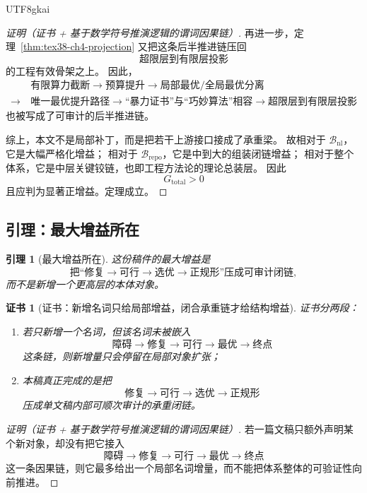 \documentclass[12pt]{article}
\newtheorem{lemma}{引理}[section]
\newtheorem{Certificate}{证书}[section]
\begin{document}
\begin{CJK*}{UTF8}{gkai}
\begin{proof}[证明（证书 + 基于数学符号推演逻辑的谓词因果链）]
再进一步，定理~\ref{thm:tex38-ch4-projection} 又把这条后半推进链压回
\[
  \text{超限层到有限层投影}
\]
的工程有效骨架之上。
因此，
\[
  \begin{aligned}
    &\text{有限算力截断}
    \to
    \text{预算提升}
    \to
    \text{局部最优/全局最优分离}\\
    \to\ &
    \text{唯一最优提升路径}
    \to
    \text{“暴力证书”与“巧妙算法”相容}
    \to
    \text{超限层到有限层投影}
  \end{aligned}
\]
也被写成了可审计的后半推进链。

综上，本文不是局部补丁，而是把若干上游接口接成了承重梁。
故相对于 $\mathcal{B}_{\mathrm{nl}}$，它是大幅严格化增益；
相对于 $\mathcal{B}_{\mathrm{repo}}$，它是中到大的组装闭链增益；
相对于整个体系，它是中层关键铰链，也即工程方法论的理论总装层。
因此
\[
  G_{\mathrm{total}}>0
\]
且应判为显著正增益。定理成立。
\end{proof}

\subsection{引理：最大增益所在}
\label{subsec:tex38-gain-largest}

\begin{lemma}[最大增益所在]
\label{lem:tex38-gain-largest}
这份稿件的最大增益是
\[
  \boxed{
    \text{把“修复}\to\text{可行}\to\text{选优}\to\text{正规形”压成可审计闭链}
  },
\]
而不是新增一个更高层的本体对象。
\end{lemma}

\begin{Certificate}[证书：新增名词只给局部增益，闭合承重链才给结构增益]
\label{cert:tex38-gain-largest}
证书分两段：
\begin{enumerate}
  \item 若只新增一个名词，但该名词未被嵌入
  \[
    \text{障碍}
    \to
    \text{修复}
    \to
    \text{可行}
    \to
    \text{最优}
    \to
    \text{终点}
  \]
  这条链，则新增量只会停留在局部对象扩张；
  \item 本稿真正完成的是把
  \[
    \text{修复}
    \to
    \text{可行}
    \to
    \text{选优}
    \to
    \text{正规形}
  \]
  压成单文稿内部可顺次审计的承重闭链。
\end{enumerate}
\end{Certificate}

\begin{proof}[证明（证书 + 基于数学符号推演逻辑的谓词因果链）]
若一篇文稿只额外声明某个新对象，却没有把它接入
\[
  \text{障碍}
  \to
  \text{修复}
  \to
  \text{可行}
  \to
  \text{最优}
  \to
  \text{终点}
\]
这一条因果链，则它最多给出一个局部名词增量，而不能把体系整体的可验证性向前推进。


\end{proof}
\end{CJK*}
\end{document}
